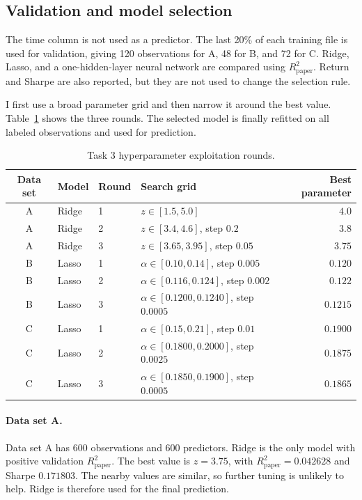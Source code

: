 \documentclass[11pt]{article}
\begin{document}
\subsection{Validation and model selection}

The time column is not used as a predictor. The last 20\% of each training
file is used for validation, giving 120 observations for A, 48 for B, and 72
for C. Ridge, Lasso, and a one-hidden-layer neural network are compared using
$R^2_{\mathrm{paper}}$. Return and Sharpe are also reported, but they are not
used to change the selection rule.

I first use a broad parameter grid and then narrow it around the best value.
Table~\ref{tab:task3-exploit} shows the three rounds. The selected model is
finally refitted on all labeled observations and used for prediction.

\begin{table}[htbp]
    \centering
    \small
    \caption{Task 3 hyperparameter exploitation rounds.}
    \label{tab:task3-exploit}
    \begin{tabular}{clllr}
        \toprule
        Data set & Model & Round & Search grid & Best parameter \\
        \midrule
        A & Ridge & 1 & $z\in[1.5,5.0]$ & $4.0$ \\
        A & Ridge & 2 & $z\in[3.4,4.6]$, step $0.2$ & $3.8$ \\
        A & Ridge & 3 & $z\in[3.65,3.95]$, step $0.05$ & $3.75$ \\
        \midrule
        B & Lasso & 1 & $\alpha\in[0.10,0.14]$, step $0.005$ & $0.120$ \\
        B & Lasso & 2 & $\alpha\in[0.116,0.124]$, step $0.002$ & $0.122$ \\
        B & Lasso & 3 & $\alpha\in[0.1200,0.1240]$, step $0.0005$ & $0.1215$ \\
        \midrule
        C & Lasso & 1 & $\alpha\in[0.15,0.21]$, step $0.01$ & $0.1900$ \\
        C & Lasso & 2 & $\alpha\in[0.1800,0.2000]$, step $0.0025$ & $0.1875$ \\
        C & Lasso & 3 & $\alpha\in[0.1850,0.1900]$, step $0.0005$ & $0.1865$ \\
        \bottomrule
    \end{tabular}
\end{table}

\paragraph{Data set A.}
Data set A has 600 observations and 600 predictors. Ridge is the only model
with positive validation $R^2_{\mathrm{paper}}$. The best value is $z=3.75$,
with $R^2_{\mathrm{paper}}=0.042628$ and Sharpe $0.171803$. The nearby values
are similar, so further tuning is unlikely to help. Ridge is therefore used
for the final prediction.
\end{document}
